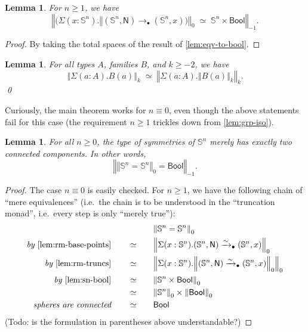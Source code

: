 \documentclass[11pt,a4paper,oneside,reqno]{amsart}
\newtheorem{lemma}[theorem]{Lemma}
\theoremstyle{definition}
\theoremstyle{remark}
\newcommand{\sph}[1]{{\mathbb S}^{#1}}
\newcommand{\trunc}[2]{\mathopen{}\left\Vert #2\right\Vert_{#1}\mathclose{}}
\newcommand{\North}{\mathsf N}
\begin{document}
\begin{lemma} \label{lem:sn-bool}
 For $n \geq 1$, we have
 \begin{equation}
  \trunc {-1} {\big(\Sigma (x : \sph n). \trunc 0 {(\sph n , \North) \to_\bullet (\sph n, x)\big)} \; \simeq \; \sph n \times \mathsf{Bool}}.
 \end{equation}
\end{lemma}
\begin{proof}
 By taking the total spaces of the result of \cref{lem:eqv-to-bool}.
\end{proof}

\begin{lemma} \label{lem:rm-truncs}
 For all types $A$, families $B$, and $k \geq -2$, we have
 \begin{equation}
  \trunc k {\Sigma (a : A). B(a)} \; \simeq \; \trunc k {\Sigma (a : A). \trunc k {B(a)}}.
 \end{equation}
 \qed
\end{lemma}

Curiously, the main theorem works for $n \equiv 0$, even though the above statements fail for this case (the requirement $n \geq 1$ trickles down from \cref{lem:grp-iso}).
\begin{lemma} \label{lem:mainlemma}
 For all $n \geq 0$, the type of symmetries of $\sph n$ merely has exactly two connected components.
 In other words,
 \begin{equation}
  \trunc {-1} {\trunc 0 {\sph n = \sph n} = \mathsf{Bool}}.
 \end{equation}
\end{lemma}
\begin{proof}
 The case $n \equiv 0$ is easily checked.
 For $n \geq 1$, we have the following chain of ``mere equivalences'' (i.e.\ the chain is to be understood in the ``truncation monad'', i.e.\ every step is only ``merely true''):
  \begin{alignat}{5}
  &&&\trunc 0 {\sph n = \sph n} \\
  \textit{by }\cref{lem:rm-base-points} \qquad &\simeq &\quad& \trunc 0 {\Sigma(x : \sph n).(\sph n, \North) \xrightarrow{\sim}_\bullet (\sph n, x)}  \\
  \textit{by }\cref{lem:rm-truncs} \qquad &\simeq && \trunc 0 {\Sigma(x : \sph n).\trunc 0 {(\sph n, \North) \xrightarrow{\sim}_\bullet (\sph n, x)}}  \\
  \textit{by }\cref{lem:sn-bool} \qquad &\simeq && \trunc 0 {\sph n \times \mathsf{Bool}}  \\
  \textit{ } \qquad &\simeq && \trunc 0 {\sph n} \times \trunc 0 {\mathsf{Bool}}    \\
  \textit{spheres are connected} \qquad &\simeq && \mathsf{Bool}
 \end{alignat}
(Todo: is the formulation in parentheses above understandable?)
\end{proof}
\end{document}

